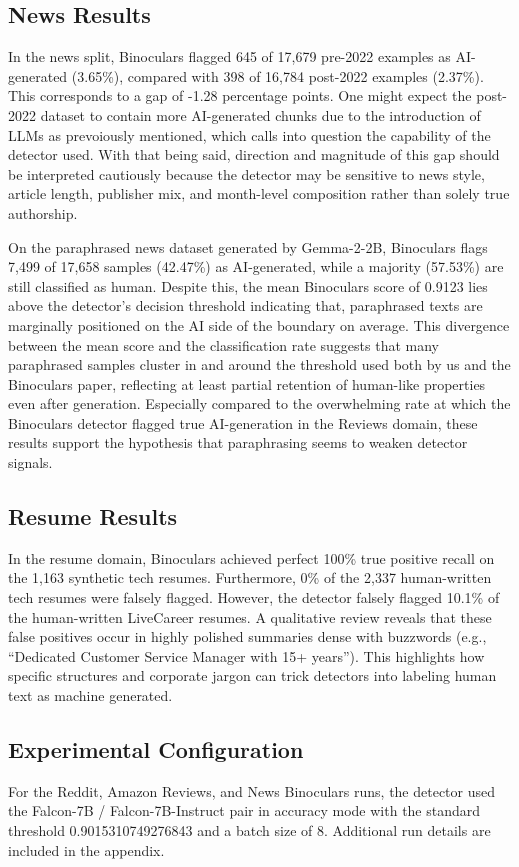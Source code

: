 \documentclass[11pt]{article}
\begin{document}
\subsection{News Results}
In the news split, Binoculars flagged 645 of 17,679 pre-2022 examples as AI-generated (3.65\%), compared with 398 of 16,784 post-2022 examples (2.37\%). This corresponds to a gap of -1.28 percentage points. One might expect the post-2022 dataset to contain more AI-generated chunks due to the introduction of LLMs as prevoiously mentioned, which calls into question the capability of the detector used. With that being said, direction and magnitude of this gap should be interpreted cautiously because the detector may be sensitive to news style, article length, publisher mix, and month-level composition rather than solely true authorship.

On the paraphrased news dataset generated by Gemma-2-2B, Binoculars flags 7,499 of 17,658 samples (42.47\%) as AI-generated, while a majority (57.53\%) are still classified as human. Despite this, the mean Binoculars score of 0.9123 lies above the detector’s decision threshold indicating that, paraphrased texts are marginally positioned on the AI side of the boundary on average. This divergence between the mean score and the classification rate suggests that many paraphrased samples cluster in and around the threshold used both by us and the Binoculars paper, reflecting at least partial retention of human-like properties even after generation. Especially compared to the overwhelming rate at which the Binoculars detector flagged true AI-generation in the Reviews domain, these results support the hypothesis that paraphrasing seems to weaken detector signals.

\subsection{Resume Results}
In the resume domain, Binoculars achieved perfect 100\% true positive recall on the 1,163 synthetic tech resumes. Furthermore, 0\% of the 2,337 human-written tech resumes were falsely flagged. However, the detector falsely flagged 10.1\% of the human-written LiveCareer resumes. A qualitative review reveals that these false positives occur in highly polished summaries dense with buzzwords (e.g., ``Dedicated Customer Service Manager with 15+ years''). This highlights how specific structures and corporate jargon can trick detectors into labeling human text as machine generated.


\subsection{Experimental Configuration}
For the Reddit, Amazon Reviews, and News Binoculars runs, the detector used the Falcon-7B /
Falcon-7B-Instruct pair in accuracy mode with the standard threshold
0.9015310749276843 and a batch size of 8. Additional run details are included
in the appendix.
\end{document}
